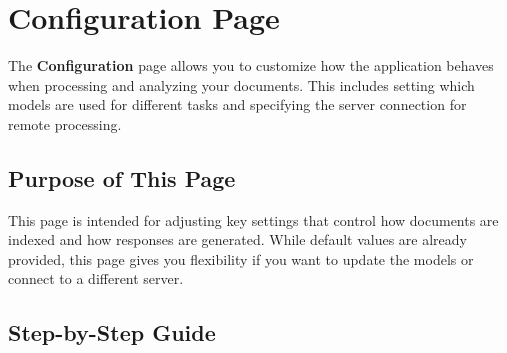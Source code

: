\documentclass[11pt,a4paper]{report}
\begin{document}
\section{Configuration Page}

The \textbf{Configuration} page allows you to customize how the application behaves when processing and analyzing your documents. This includes setting which models are used for different tasks and specifying the server connection for remote processing.

\subsection*{Purpose of This Page}

This page is intended for adjusting key settings that control how documents are indexed and how responses are generated. While default values are already provided, this page gives you flexibility if you want to update the models or connect to a different server.

\subsection*{Step-by-Step Guide}
\end{document}
